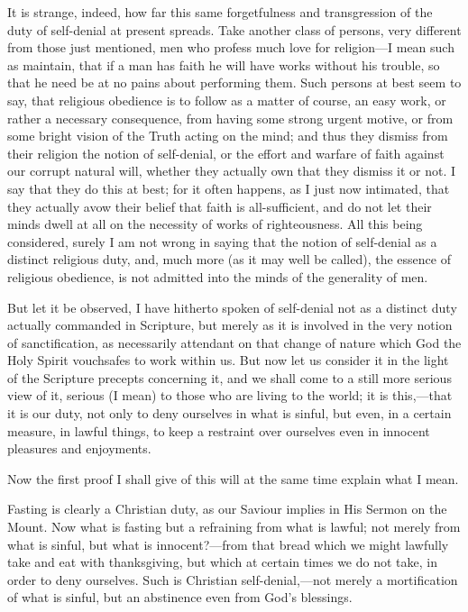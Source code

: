 It is strange, indeed, how far this same forgetfulness and
transgression of the duty of self-denial at present spreads. Take
another class of persons, very different from those just mentioned,
men who profess much love for religion—I mean such as maintain, that
if a man has faith he will have works without his trouble, so that he
need be at no pains about performing them. Such persons at best seem
to say, that religious obedience is to follow as a matter of course,
an easy work, or rather a necessary consequence, from having some
strong urgent motive, or from some bright vision of the Truth acting
on the mind; and thus they dismiss from their religion the notion of
self-denial, or the effort and warfare of faith against our corrupt
natural will, whether they actually own that they dismiss it or not. I
say that they do this at best; for it often happens, as I just now
intimated, that they actually avow their belief that faith is
all-sufficient, and do not let their minds dwell at all on the
necessity of works of righteousness. All this being considered, surely
I am not wrong in saying that the notion of self-denial as a distinct
religious duty, and, much more (as it may well be called), the essence
of religious obedience, is not admitted into the minds of the
generality of men.

But let it be observed, I have hitherto spoken of self-denial not
as a distinct duty actually commanded in Scripture, but merely as it
is involved in the very notion of sanctification, as necessarily
attendant on that change of nature which God the Holy Spirit
vouchsafes to work within us. But now let us consider it in the light
of the Scripture precepts concerning it, and we shall come to a still
more serious view of it, serious (I mean) to those who are living to
the world; it is this,—that it is our duty, not only to deny
ourselves in what is sinful, but even, in a certain measure, in lawful
things, to keep a restraint over ourselves even in innocent pleasures
and enjoyments.

Now the first proof I shall give of this will at the same time
explain what I mean.

Fasting is clearly a Christian duty, as our Saviour implies in His
Sermon on the Mount. Now what is fasting but a refraining from what is
lawful; not merely from what is sinful, but what is innocent?—from
that bread which we might lawfully take and eat with thanksgiving, but
which at certain times we do not take, in order to deny ourselves.
Such is Christian self-denial,—not merely a mortification of what is
sinful, but an abstinence even from God's blessings.

